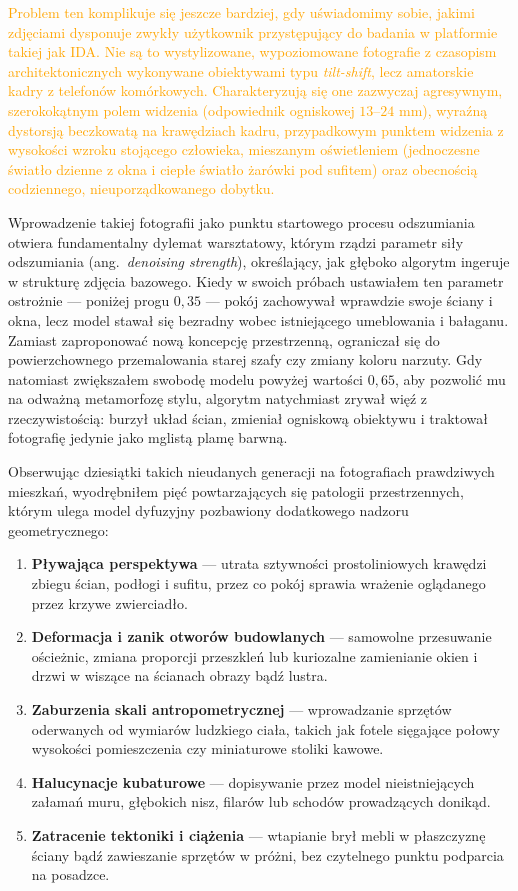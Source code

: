 \textcolor{orange}{Problem ten komplikuje się jeszcze bardziej, gdy uświadomimy sobie, jakimi zdjęciami dysponuje zwykły użytkownik przystępujący do badania w platformie takiej jak IDA. Nie są to wystylizowane, wypoziomowane fotografie z czasopism architektonicznych wykonywane obiektywami typu \emph{tilt-shift}, lecz amatorskie kadry z telefonów komórkowych. Charakteryzują się one zazwyczaj agresywnym, szerokokątnym polem widzenia (odpowiednik ogniskowej $13$--$24\text{ mm}$), wyraźną dystorsją beczkowatą na krawędziach kadru, przypadkowym punktem widzenia z wysokości wzroku stojącego człowieka, mieszanym oświetleniem (jednoczesne światło dzienne z okna i ciepłe światło żarówki pod sufitem) oraz obecnością codziennego, nieuporządkowanego dobytku.}

Wprowadzenie takiej fotografii jako punktu startowego procesu odszumiania otwiera fundamentalny dylemat warsztatowy, którym rządzi parametr siły odszumiania (ang.\ \emph{denoising strength}), określający, jak głęboko algorytm ingeruje w strukturę zdjęcia bazowego. Kiedy w swoich próbach ustawiałem ten parametr ostrożnie --- poniżej progu $0{,}35$ --- pokój zachowywał wprawdzie swoje ściany i okna, lecz model stawał się bezradny wobec istniejącego umeblowania i bałaganu. Zamiast zaproponować nową koncepcję przestrzenną, ograniczał się do powierzchownego przemalowania starej szafy czy zmiany koloru narzuty. Gdy natomiast zwiększałem swobodę modelu powyżej wartości $0{,}65$, aby pozwolić mu na odważną metamorfozę stylu, algorytm natychmiast zrywał więź z rzeczywistością: burzył układ ścian, zmieniał ogniskową obiektywu i traktował fotografię jedynie jako mglistą plamę barwną.

Obserwując dziesiątki takich nieudanych generacji na fotografiach prawdziwych mieszkań, wyodrębniłem pięć powtarzających się patologii przestrzennych, którym ulega model dyfuzyjny pozbawiony dodatkowego nadzoru geometrycznego:
\begin{enumerate}
  \item \textbf{Pływająca perspektywa} --- utrata sztywności prostoliniowych krawędzi zbiegu ścian, podłogi i sufitu, przez co pokój sprawia wrażenie oglądanego przez krzywe zwierciadło.
  \item \textbf{Deformacja i zanik otworów budowlanych} --- samowolne przesuwanie ościeżnic, zmiana proporcji przeszkleń lub kuriozalne zamienianie okien i drzwi w wiszące na ścianach obrazy bądź lustra.
  \item \textbf{Zaburzenia skali antropometrycznej} --- wprowadzanie sprzętów oderwanych od wymiarów ludzkiego ciała, takich jak fotele sięgające połowy wysokości pomieszczenia czy miniaturowe stoliki kawowe.
  \item \textbf{Halucynacje kubaturowe} --- dopisywanie przez model nieistniejących załamań muru, głębokich nisz, filarów lub schodów prowadzących donikąd.
  \item \textbf{Zatracenie tektoniki i ciążenia} --- wtapianie brył mebli w płaszczyznę ściany bądź zawieszanie sprzętów w próżni, bez czytelnego punktu podparcia na posadzce.
\end{enumerate}

